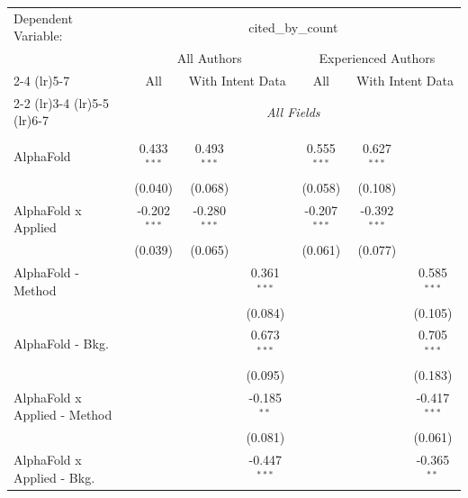 \begingroup
\centering
\begin{tabular}{lcccccc}
   \tabularnewline \midrule \midrule
   Dependent Variable: & \multicolumn{6}{c}{cited\_by\_count}\\
 & \multicolumn{3}{c}{All Authors} & \multicolumn{3}{c}{Experienced Authors} \\
\cmidrule(lr){2-4} \cmidrule(lr){5-7}
 & \multicolumn{1}{c}{All} & \multicolumn{2}{c}{With Intent Data} & \multicolumn{1}{c}{All} & \multicolumn{2}{c}{With Intent Data} \\
\cmidrule(lr){2-2} \cmidrule(lr){3-4} \cmidrule(lr){5-5} \cmidrule(lr){6-7}
 & \multicolumn{6}{c}{\textit{All Fields}} \\ \\
   AlphaFold                      & 0.433$^{***}$  & 0.493$^{***}$  &                & 0.555$^{***}$  & 0.627$^{***}$  &   \\   
                                  & (0.040)        & (0.068)        &                & (0.058)        & (0.108)        &   \\   
   AlphaFold x Applied            & -0.202$^{***}$ & -0.280$^{***}$ &                & -0.207$^{***}$ & -0.392$^{***}$ &   \\   
                                  & (0.039)        & (0.065)        &                & (0.061)        & (0.077)        &   \\   
   AlphaFold - Method             &                &                & 0.361$^{***}$  &                &                & 0.585$^{***}$\\   
                                  &                &                & (0.084)        &                &                & (0.105)\\   
   AlphaFold - Bkg.               &                &                & 0.673$^{***}$  &                &                & 0.705$^{***}$\\   
                                  &                &                & (0.095)        &                &                & (0.183)\\   
   AlphaFold x Applied - Method   &                &                & -0.185$^{**}$  &                &                & -0.417$^{***}$\\   
                                  &                &                & (0.081)        &                &                & (0.061)\\   
   AlphaFold x Applied - Bkg.     &                &                & -0.447$^{***}$ &                &                & -0.365$^{**}$\\   

\end{tabular}
